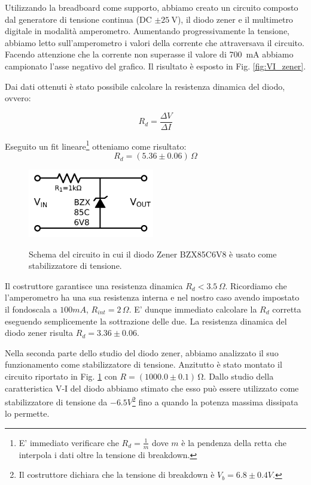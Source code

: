 Utilizzando la breadboard come supporto, abbiamo creato un circuito composto dal generatore di tensione continua (DC $\pm \SI{25}{\volt}$), il diodo zener e il multimetro digitale in modalità amperometro. Aumentando progressivamente la tensione, abbiamo letto sull'amperometro i valori della corrente che attraversava il circuito.
Facendo attenzione che la corrente non superasse il valore di \SI{700}{\milli\ampere} abbiamo campionato l'asse negativo del grafico. Il risultato è esposto in Fig. \ref{fig:VI_zener}.




Dai dati ottenuti è stato possibile calcolare la resistenza dinamica del diodo, ovvero:



\begin{equation}
R_d=\frac{\Delta V}{\Delta I}
\label{scemopagliaccio}
\end{equation}

Eseguito un fit lineare\footnote{E' immediato verificare che $R_d=\frac{1}{m}$ dove $m$ è la pendenza della retta che interpola i dati oltre la tensione di breakdown.} otteniamo come risultato:
$$R_d= (5.36 \pm 0.06)\,\Omega$$

\begin{figure}
	\caption{Schema del circuito in cui il diodo Zener BZX85C6V8 è usato come stabilizzatore di tensione.}
	\includegraphics[width=55mm]{schema_zener.pdf}
	\label{fig:schema_zener}
\end{figure}

Il costruttore garantisce una resistenza dinamica $R_d<3.5 \, \Omega$. Ricordiamo che l'amperometro ha una sua resistenza interna e nel nostro caso avendo impostato il fondoscala a $100mA$, $R_{int}=2\, \Omega$. E' dunque immediato calcolare la $R_d$ corretta eseguendo semplicemente la sottrazione delle due. La resistenza dinamica del diodo zener risulta $R_d=3.36 \pm 0.06$.


Nella seconda parte dello studio del diodo zener, abbiamo analizzato il suo funzionamento come stabilizzatore di tensione. Anzitutto è stato montato il circuito riportato in Fig. \ref{fig:schema_zener} con $R = (1000.0 \pm 0.1) \, \si{\ohm}$.  Dallo studio della caratteristica V-I del diodo abbiamo stimato che esso può essere utilizzato come stabilizzatore di tensione da $-6.5 V$\footnote{Il costruttore dichiara che la tensione di breakdown è $V_b=6.8 \pm 0.4 V$.} fino a quando la potenza massima dissipata lo permette. 


